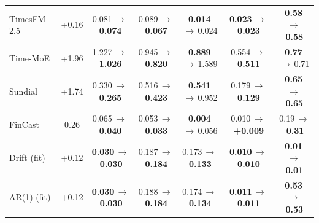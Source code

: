 \begin{tabular}{@{}lcccccc@{}}
TimesFM-2.5 & +0.16 & \textminus{}0.081\,$\to$\,\textbf{\textminus{}0.074} & \textminus{}0.089\,$\to$\,\textbf{\textminus{}0.067} & \textbf{\textminus{}0.014}\,$\to$\,\textminus{}0.024 & \textbf{\textminus{}0.023}\,$\to$\,\textbf{\textminus{}0.023} & \textbf{0.58}\,$\to$\,\textbf{0.58} \\
Time-MoE & +1.96 & \textminus{}1.227\,$\to$\,\textbf{\textminus{}1.026} & \textminus{}0.945\,$\to$\,\textbf{\textminus{}0.820} & \textbf{\textminus{}0.889}\,$\to$\,\textminus{}1.589 & \textminus{}0.554\,$\to$\,\textbf{\textminus{}0.511} & \textbf{0.77}\,$\to$\,0.71 \\
Sundial & +1.74 & \textminus{}0.330\,$\to$\,\textbf{\textminus{}0.265} & \textminus{}0.516\,$\to$\,\textbf{\textminus{}0.423} & \textbf{\textminus{}0.541}\,$\to$\,\textminus{}0.952 & \textminus{}0.179\,$\to$\,\textbf{\textminus{}0.129} & \textbf{0.65}\,$\to$\,\textbf{0.65} \\
FinCast & \textminus{}0.26 & \textminus{}0.065\,$\to$\,\textbf{\textminus{}0.040} & \textminus{}0.053\,$\to$\,\textbf{\textminus{}0.033} & \textbf{\textminus{}0.004}\,$\to$\,\textminus{}0.056 & \textminus{}0.010\,$\to$\,\textbf{+0.009} & 0.19\,$\to$\,\textbf{0.31} \\
\midrule
Drift (fit) & +0.12 & \textbf{\textminus{}0.030}\,$\to$\,\textbf{\textminus{}0.030} & \textminus{}0.187\,$\to$\,\textbf{\textminus{}0.184} & \textminus{}0.173\,$\to$\,\textbf{\textminus{}0.133} & \textbf{\textminus{}0.010}\,$\to$\,\textbf{\textminus{}0.010} & \textbf{\textminus{}0.01}\,$\to$\,\textbf{\textminus{}0.01} \\
AR(1) (fit) & +0.12 & \textbf{\textminus{}0.030}\,$\to$\,\textbf{\textminus{}0.030} & \textminus{}0.188\,$\to$\,\textbf{\textminus{}0.184} & \textminus{}0.174\,$\to$\,\textbf{\textminus{}0.134} & \textbf{\textminus{}0.011}\,$\to$\,\textbf{\textminus{}0.011} & \textbf{0.53}\,$\to$\,\textbf{0.53} \\
\bottomrule
\end{tabular}
